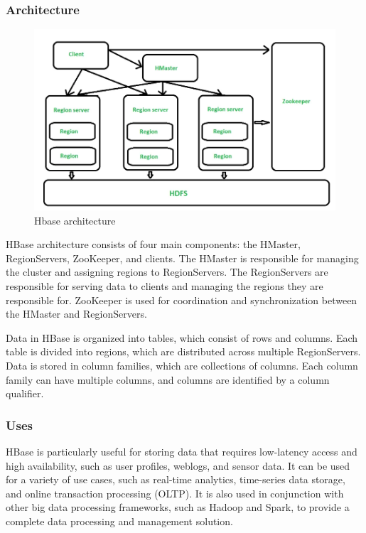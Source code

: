 \documentclass[12pt]{article}
\begin{document}
\subsubsection{Architecture}
\begin{figure}[h!]
    \centering
    \includegraphics[scale = 0.35]{images/Hbase.png}
    \caption{Hbase architecture}
\end{figure}
HBase architecture consists of four main components: the HMaster, RegionServers, ZooKeeper, and clients. The HMaster is responsible for managing the cluster and assigning regions to RegionServers. The RegionServers are responsible for serving data to clients and managing the regions they are responsible for. ZooKeeper is used for coordination and synchronization between the HMaster and RegionServers.

Data in HBase is organized into tables, which consist of rows and columns. Each table is divided into regions, which are distributed across multiple RegionServers. Data is stored in column families, which are collections of columns. Each column family can have multiple columns, and columns are identified by a column qualifier.

\subsubsection{Uses}
HBase is particularly useful for storing data that requires low-latency access and high availability, such as user profiles, weblogs, and sensor data. It can be used for a variety of use cases, such as real-time analytics, time-series data storage, and online transaction processing (OLTP). It is also used in conjunction with other big data processing frameworks, such as Hadoop and Spark, to provide a complete data processing and management solution.
\end{document}
